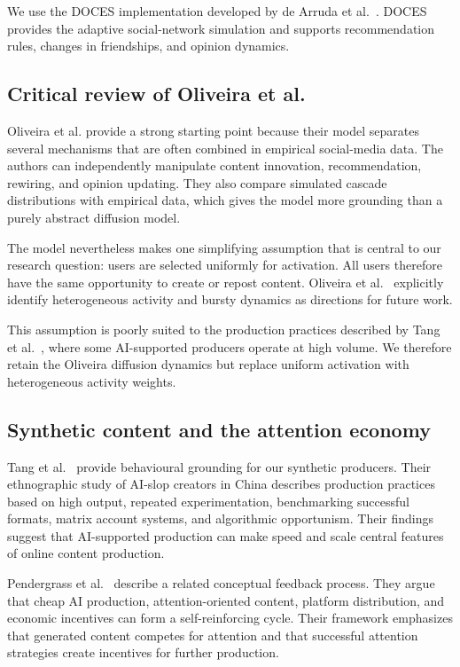 \documentclass[runningheads]{llncs}
\begin{document}
We use the DOCES implementation developed by de Arruda et al.~\cite{deArruda2025}. DOCES provides the adaptive social-network simulation and supports recommendation rules, changes in friendships, and opinion dynamics.

\subsection{Critical review of Oliveira et al.}
Oliveira et al. provide a strong starting point because their model separates several mechanisms that are often combined in empirical social-media data. The authors can independently manipulate content innovation, recommendation, rewiring, and opinion updating. They also compare simulated cascade distributions with empirical data, which gives the model more grounding than a purely abstract diffusion model.

The model nevertheless makes one simplifying assumption that is central to our research question: users are selected uniformly for activation. All users therefore have the same opportunity to create or repost content. Oliveira et al.~\cite{oliveira2026} explicitly identify heterogeneous activity and bursty dynamics as directions for future work.

This assumption is poorly suited to the production practices described by Tang et al.~\cite{tang2026}, where some AI-supported producers operate at high volume. We therefore retain the Oliveira diffusion dynamics but replace uniform activation with heterogeneous activity weights.

\subsection{Synthetic content and the attention economy}

Tang et al.~\cite{tang2026} provide behavioural grounding for our synthetic producers. Their ethnographic study of AI-slop creators in China describes production practices based on high output, repeated experimentation, benchmarking successful formats, matrix account systems, and algorithmic opportunism. Their findings suggest that AI-supported production can make speed and scale central features of online content production.

Pendergrass et al.~\cite{pendergrass2025} describe a related conceptual feedback process. They argue that cheap AI production, attention-oriented content, platform distribution, and economic incentives can form a self-reinforcing cycle. Their framework emphasizes that generated content competes for attention and that successful attention strategies create incentives for further production.
\end{document}
